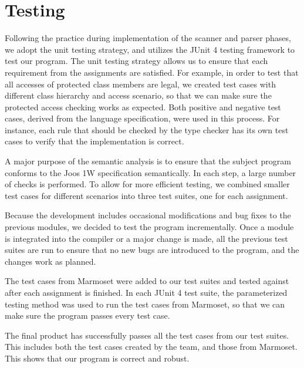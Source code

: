 \chapter{Testing}
\label{testing}
Following the practice during implementation of the scanner and parser phases, we adopt the unit testing strategy, and utilizes the JUnit 4 testing framework to test our program. The unit testing strategy allows us to ensure that each requirement from the assignments are satisfied. For example, in order to test that all accesses of protected class members are legal, we created test cases with different class hierarchy and access scenario, so that we can make sure the protected access checking works as expected. Both positive and negative test cases, derived from the language specification, were used in this process. For instance, each rule that should be checked by the type checker has its own test cases to verify that the implementation is correct.

A major purpose of the semantic analysis is to ensure that the subject program conforms to the Joos 1W specification semantically. In each step, a large number of checks is performed. To allow for more efficient testing, we combined smaller test cases for different scenarios into three test suites, one for each assignment.

Because the development includes occasional modifications and bug fixes to the previous modules, we decided to test the program incrementally. Once a module is integrated into the compiler or a major change is made, all the previous test suites are run to ensure that no new bugs are introduced to the program, and the changes work as planned.

The test cases from Marmoset were added to our test suites and tested against after each assignment is finished. In each JUnit 4 test suite, the parameterized testing method was used to run the test cases from Marmoset, so that we can make sure the program passes every test case. 

The final product has successfully passes all the test cases from our test suites. This includes both the test cases created by the team, and those from Marmoset. This shows that our program is correct and robust.